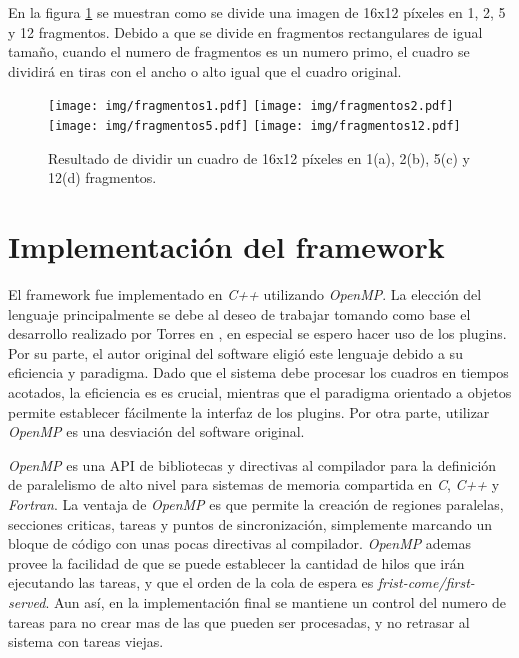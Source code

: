 En la figura \ref{fragmentos} se muestran como se divide una imagen de 16x12
píxeles en 1, 2, 5 y 12 fragmentos. Debido a que se divide en fragmentos
rectangulares de igual tamaño, cuando el numero de fragmentos es un numero
primo, el cuadro se dividirá en tiras con el ancho o alto igual que el cuadro
original.

\begin{figure}[!h]

	\texttt{[image: img/fragmentos1.pdf]}
	\texttt{[image: img/fragmentos2.pdf]}
	\texttt{[image: img/fragmentos5.pdf]}
	\texttt{[image: img/fragmentos12.pdf]}
	\caption{Resultado de dividir un cuadro de 16x12 píxeles en 1(a), 2(b),
	5(c) y 12(d) fragmentos.}
	\label{fragmentos}

\end{figure}


\section{Implementación del framework}

El framework fue implementado en \emph{C++} utilizando \emph{OpenMP}. La
elección del lenguaje principalmente se debe al deseo de trabajar tomando como
base el desarrollo realizado por Torres en \cite{torres2014}, en especial se
espero hacer uso de los plugins. Por su parte, el autor original del software
eligió este lenguaje debido a su eficiencia y paradigma. Dado que el sistema
debe procesar los cuadros en tiempos acotados, la eficiencia es es crucial,
mientras que el paradigma orientado a objetos permite establecer fácilmente la
interfaz de los plugins. Por otra parte, utilizar \emph{OpenMP} es una
desviación del software original.

\emph{OpenMP} es una API de bibliotecas y directivas al compilador para la
definición de paralelismo de alto nivel para sistemas de memoria compartida en
\emph{C}, \emph{C++} y \emph{Fortran}\cite{ompWeb}. La ventaja de \emph{OpenMP}
es que permite la creación de regiones paralelas, secciones criticas, tareas y
puntos de sincronización, simplemente marcando un bloque de código con unas
pocas directivas al compilador. \emph{OpenMP} ademas provee la facilidad de que
se puede establecer la cantidad de hilos que irán ejecutando las tareas, y que
el orden de la cola de espera es \emph{frist-come/first-served}. Aun así, en la
implementación final se mantiene un control del numero de tareas para no crear
mas de las que pueden ser procesadas, y no retrasar al sistema con tareas
viejas.

